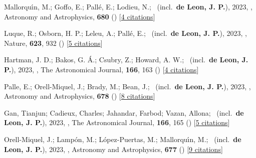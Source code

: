 \item[{\color{numcolor}\scriptsize58}] Mallorqu{\'\i}n, M.; Goffo, E.; Pall{\'e}, E.; Lodieu, N.; \etal\ (incl.\ \textbf{de Leon, J. P.}), 2023, , Astronomy and Astrophysics, \textbf{680} () [\href{https://ui.adsabs.harvard.edu/abs/2023A&A...680A..76M}{4 citations}]

\item[{\color{numcolor}\scriptsize57}] Luque, R.; Osborn, H. P.; Leleu, A.; Pall{\'e}, E.; \etal\ (incl.\ \textbf{de Leon, J. P.}), 2023, , Nature, \textbf{623}, 932 () [\href{https://ui.adsabs.harvard.edu/abs/2023Natur.623..932L}{5 citations}]

\item[{\color{numcolor}\scriptsize56}] Hartman, J. D.; Bakos, G. {\'A}.; Csubry, Z.; Howard, A. W.; \etal\ (incl.\ \textbf{de Leon, J. P.}), 2023, , The Astronomical Journal, \textbf{166}, 163 () [\href{https://ui.adsabs.harvard.edu/abs/2023AJ....166..163H}{4 citations}]

\item[{\color{numcolor}\scriptsize55}] Palle, E.; Orell-Miquel, J.; Brady, M.; Bean, J.; \etal\ (incl.\ \textbf{de Leon, J. P.}), 2023, , Astronomy and Astrophysics, \textbf{678} () [\href{https://ui.adsabs.harvard.edu/abs/2023A&A...678A..80P}{8 citations}]

\item[{\color{numcolor}\scriptsize54}] Gan, Tianjun; Cadieux, Charles; Jahandar, Farbod; Vazan, Allona; \etal\ (incl.\ \textbf{de Leon, J. P.}), 2023, , The Astronomical Journal, \textbf{166}, 165 () [\href{https://ui.adsabs.harvard.edu/abs/2023AJ....166..165G}{5 citations}]

\item[{\color{numcolor}\scriptsize53}] Orell-Miquel, J.; Lamp{\'o}n, M.; L{\'o}pez-Puertas, M.; Mallorqu{\'\i}n, M.; \etal\ (incl.\ \textbf{de Leon, J. P.}), 2023, , Astronomy and Astrophysics, \textbf{677} () [\href{https://ui.adsabs.harvard.edu/abs/2023A&A...677A..56O}{9 citations}]

